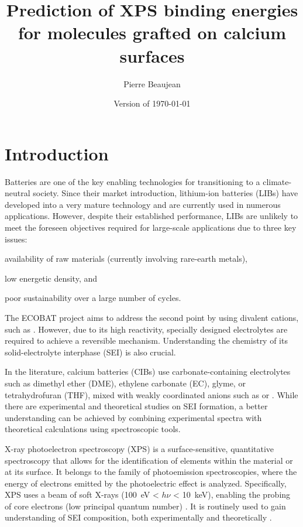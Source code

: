 \documentclass[12pt,a4paper]{article}
\title{Prediction of XPS binding energies for molecules grafted on calcium surfaces}
\author{Pierre Beaujean}
\date{Version of \today}
\begin{document}
\maketitle

\section{Introduction}

Batteries are one of the key enabling technologies for transitioning to a climate-neutral society. Since their market introduction, lithium-ion batteries (LIBs) have developed into a very mature technology and are currently used in numerous applications. However, despite their established performance, LIBs are unlikely to meet the foreseen objectives required for large-scale applications due to three key issues:
\begin{inparaenum}[(i)]
	\item availability of raw materials (currently involving rare-earth metals),
	\item low energetic density, and
	\item poor sustainability over a large number of cycles.
\end{inparaenum}

The ECOBAT project aims to address the second point by using divalent cations, such as . However, due to its high reactivity, specially designed electrolytes are required to achieve a reversible mechanism. Understanding the chemistry of its solid-electrolyte interphase (SEI) is also crucial.

In the literature, calcium batteries (CIBs) use carbonate-containing electrolytes such as dimethyl ether (DME), ethylene carbonate (EC), glyme, or tetrahydrofuran (THF), mixed with weakly coordinated anions such as  or  \cite{zhaoRevealingSolidElectrolyte2022,taghavi-kahaghPoweringFutureComprehensive2023}. While there are experimental \cite{melemedImpactDifferentialCa22023} and theoretical \cite{hahnCriticalRoleConfigurational2020,liepinyaComputationalComparisonEther2021,pathreekerWhyTetrahydrofuranGood2021,yamijalaStabilityCalciumIon2021} studies on SEI formation, a better understanding can be achieved by combining experimental spectra with theoretical calculations using spectroscopic tools.

X-ray photoelectron spectroscopy (XPS) is a surface-sensitive, quantitative spectroscopy that allows for the identification of elements within the material or at its surface. It belongs to the family of photoemission spectroscopies, where the energy of electrons emitted by the photoelectric effect is analyzed. Specifically, XPS uses a beam of soft X-rays (\SI{100}{\electronvolt} < $h\nu$ < \SI{10}{\kilo\electronvolt}), enabling the probing of core electrons (low principal quantum number) \cite{stevieIntroductionXrayPhotoelectron2020}. It is routinely used to gain understanding of SEI composition, both experimentally \cite{melemedImpactDifferentialCa22023} and theoretically \cite{ebadiInsightsLiMetalOrganic2019}.
\end{document}
